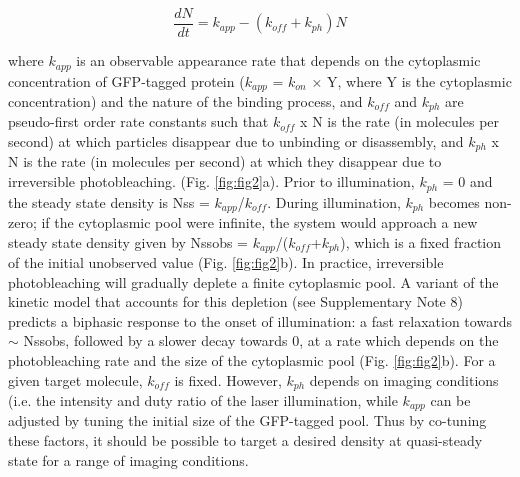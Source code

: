 \begin{equation}
 \frac{dN}{dt}=k_{app} - (k_{off} + k_{ph})N
 \end{equation}
 
 where $k_{app}$ is an observable appearance rate that depends on the cytoplasmic concentration of GFP-tagged protein ($k_{app}$ = $k_{on}$ × Y, where Y is the cytoplasmic concentration) and the nature of the binding process, and $k_{off}$ and $k_{ph}$ are pseudo-first order rate constants such that $k_{off}$ x N is the rate (in molecules per second) at which particles disappear due to unbinding or disassembly, and $k_{ph}$ x N is the rate (in molecules per second) at which they disappear due to irreversible photobleaching. (Fig. \ref{fig:fig2}a). Prior to illumination, $k_{ph}$ = 0 and the steady state density is Nss = $k_{app}$/$k_{off}$. During illumination, $k_{ph}$ becomes non-zero; if the cytoplasmic pool were infinite, the system would approach a new steady state density given by Nssobs = $k_{app}$/($k_{off}$+$k_{ph}$), which is a fixed fraction of the initial unobserved value (Fig. \ref{fig:fig2}b). In practice, irreversible photobleaching will gradually deplete a finite cytoplasmic pool. A variant of the kinetic model that accounts for this depletion (see Supplementary Note 8) predicts a biphasic response to the onset of illumination: a fast relaxation towards $\sim$ Nssobs, followed by a slower decay towards 0, at a rate which depends on the photobleaching rate and the size of the cytoplasmic pool (Fig. \ref{fig:fig2}b). For a given target molecule, $k_{off}$ is fixed. However, $k_{ph}$ depends on imaging conditions (i.e. the intensity and duty ratio of the laser illumination, while $k_{app}$ can be adjusted by tuning the initial size of the GFP-tagged pool. Thus by co-tuning these factors, it should be possible to target a desired density at quasi-steady state for a range of imaging conditions.
 
 
 
